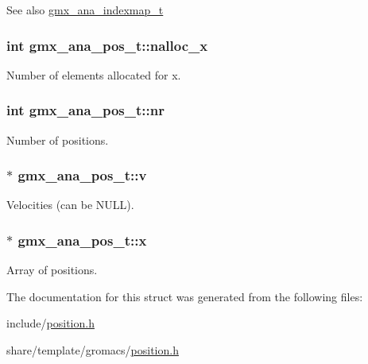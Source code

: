 \begin{DoxySeeAlso}{\-See also}
\hyperlink{structgmx__ana__indexmap__t}{gmx\-\_\-ana\-\_\-indexmap\-\_\-t} 
\end{DoxySeeAlso}
\hypertarget{structgmx__ana__pos__t_aed78236d047849d2d5f5363310512282}{
\subsubsection[{nalloc\-\_\-x}]{\setlength{\rightskip}{0pt plus 5cm}int {\bf gmx\-\_\-ana\-\_\-pos\-\_\-t\-::nalloc\-\_\-x}}}\label{structgmx__ana__pos__t_aed78236d047849d2d5f5363310512282}


\-Number of elements allocated for {\ttfamily x}. 

\hypertarget{structgmx__ana__pos__t_a97807eb00cb8f19c40985dba69550029}{
\subsubsection[{nr}]{\setlength{\rightskip}{0pt plus 5cm}int {\bf gmx\-\_\-ana\-\_\-pos\-\_\-t\-::nr}}}\label{structgmx__ana__pos__t_a97807eb00cb8f19c40985dba69550029}


\-Number of positions. 

\hypertarget{structgmx__ana__pos__t_ad8dabea9b34f51e95d4f1d3fee6b3306}{
\subsubsection[{v}]{ $\ast$ {\bf gmx\-\_\-ana\-\_\-pos\-\_\-t\-::v}}}\label{structgmx__ana__pos__t_ad8dabea9b34f51e95d4f1d3fee6b3306}


\-Velocities (can be \-N\-U\-L\-L). 

\hypertarget{structgmx__ana__pos__t_acbb8fe97fa65a1020d3c40af55c7a690}{
\subsubsection[{x}]{ $\ast$ {\bf gmx\-\_\-ana\-\_\-pos\-\_\-t\-::x}}}\label{structgmx__ana__pos__t_acbb8fe97fa65a1020d3c40af55c7a690}


\-Array of positions. 



\-The documentation for this struct was generated from the following files\-:\begin{DoxyCompactItemize}
\item 
include/\hyperlink{include_2position_8h}{position.\-h}\item 
share/template/gromacs/\hyperlink{share_2template_2gromacs_2position_8h}{position.\-h}\end{DoxyCompactItemize}
